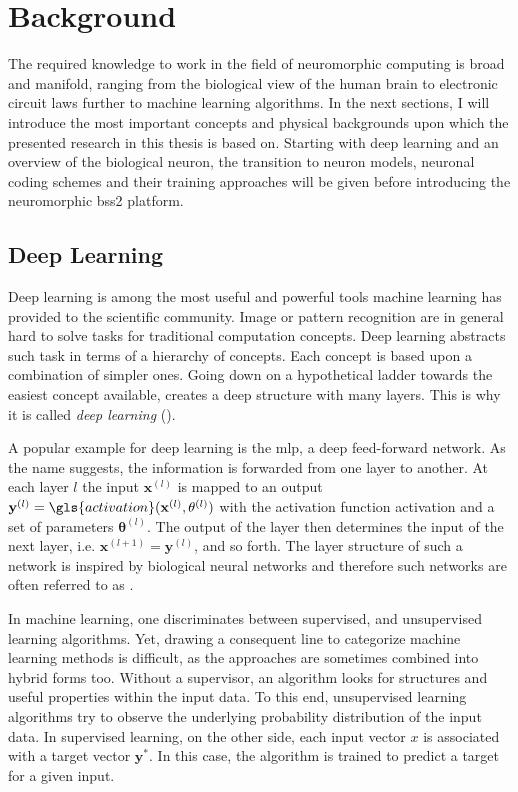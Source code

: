 \chapter{Background}
The required knowledge to work in the field of neuromorphic computing is broad and manifold, ranging from the biological view of the human brain to electronic circuit laws further to machine learning algorithms. In the next sections, I will introduce the most important concepts and physical backgrounds upon which the presented research in this thesis is based on. Starting with deep learning and an overview of the biological neuron, the transition to neuron models, neuronal coding schemes and their training approaches will be given before introducing the neuromorphic \gls{bss2} platform.
\section{Deep Learning}
\label{deeplearning}
Deep learning is among the most useful and powerful tools machine learning has provided to the scientific community. Image or pattern recognition are in general hard to solve tasks for traditional computation concepts. Deep learning abstracts such task in terms of a hierarchy of concepts. Each concept is based upon a combination of simpler ones. Going down on a hypothetical ladder towards the easiest concept available, creates a deep structure with many layers. This is why it is called \emph{deep learning} (\citealp{Goodfellow-et-al-2016}).

A popular example for deep learning is the \gls{mlp}, a deep feed-forward network. As the name suggests, the information is forwarded from one layer to another. At each layer $l$ the input $\mathbf{x}^{(l)}$ is mapped to an output $\mathbf{y}^{(l)} = \gls{activation}(\mathbf{x}^{(l)}, \mathbf{\theta}^{(l)})$ with the activation function \gls{activation} and a set of parameters $\mathbf{\theta}^{(l)}$. The output of the layer then determines the input of the next layer, i.e. $\mathbf{x}^{(l+1)} = \mathbf{y}^{(l)}$, and so forth. The layer structure of such a network is inspired by biological neural networks and therefore such networks are often referred to as .

In machine learning, one discriminates between supervised, and unsupervised learning algorithms. Yet, drawing a consequent line to categorize machine learning methods is difficult, as the approaches are sometimes combined into hybrid forms too. Without a supervisor, an algorithm looks for structures and useful properties within the input data. To this end, unsupervised learning algorithms try to observe the underlying probability distribution of the input data. In supervised learning, on the other side, each input vector $x$ is associated with a target vector $\textbf{y}^*$. In this case, the algorithm is trained to predict a target for a given input.

